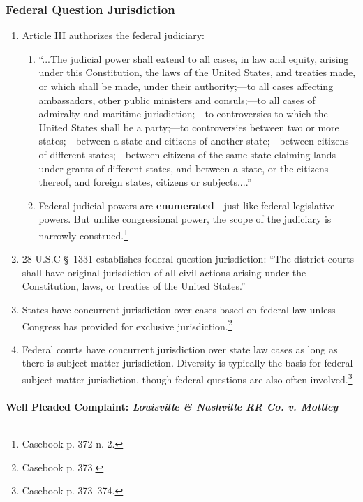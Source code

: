 \subsubsection{Federal Question Jurisdiction}

\begin{enumerate}
    \item Article III authorizes the federal judiciary:
    \begin{enumerate}
        \item ``...The judicial power shall extend to all cases, in law and 
        equity, arising under this Constitution, the laws of the United 
        States, and treaties made, or which shall be made, under their 
        authority;---to all cases affecting ambassadors, other public 
        ministers and consuls;---to all cases of admiralty and maritime 
        jurisdiction;---to controversies to which the United States shall be a 
        party;---to controversies between two or more states;---between a 
        state and citizens of another state;---between citizens of different 
        states;---between citizens of the same state claiming lands under 
        grants of different states, and between a state, or the citizens 
        thereof, and foreign states, citizens or subjects....''
        \item Federal judicial powers are \textbf{enumerated}---just like 
        federal legislative powers. But unlike congressional power, the scope 
        of the judiciary is narrowly construed.\footnote{Casebook p. 372 n. 
        2.}
    \end{enumerate}
    \item 28 U.S.C \S\ 1331 establishes federal question jurisdiction: ``The 
    district courts shall have original jurisdiction of all civil actions 
    arising under the Constitution, laws, or treaties of the United States.''
    \item States have concurrent jurisdiction over cases based on federal law 
    unless Congress has provided for exclusive jurisdiction.\footnote{Casebook 
    p. 373.}
    \item Federal courts have concurrent jurisdiction over state law cases as 
    long as there is subject matter jurisdiction. Diversity is typically the 
    basis for federal subject matter jurisdiction, though federal questions 
    are also often involved.\footnote{Casebook p. 373--374.}
\end{enumerate}

\paragraph{Well Pleaded Complaint: \emph{Louisville \& Nashville RR Co. v.  
Mottley}}

